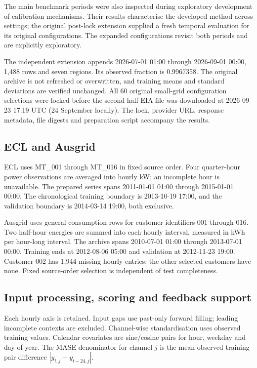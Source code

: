 \documentclass[11pt,a4paper]{article}
\begin{document}
The main benchmark periods were also inspected during exploratory development of calibration mechanisms. Their results characterise the developed method across settings; the original post-lock extension supplied a fresh temporal evaluation for its original configurations. The expanded configurations revisit both periods and are explicitly exploratory.

The independent extension appends 2026-07-01 01:00 through 2026-09-01 00:00, 1,488 rows and seven regions. Its observed fraction is 0.9967358. The original archive is not refreshed or overwritten, and training means and standard deviations are verified unchanged. All 60 original small-grid configuration selections were locked before the second-half EIA file was downloaded at 2026-09-23 17:19 UTC (24 September locally). The lock, provider URL, response metadata, file digests and preparation script accompany the results.

\subsection{ECL and Ausgrid}
ECL uses MT\_001 through MT\_016 in fixed source order. Four quarter-hour power observations are averaged into hourly kW; an incomplete hour is unavailable. The prepared series spans 2011-01-01 01:00 through 2015-01-01 00:00. The chronological training boundary is 2013-10-19 17:00, and the validation boundary is 2014-03-14 19:00, both exclusive.

Ausgrid uses general-consumption rows for customer identifiers 001 through 016. Two half-hour energies are summed into each hourly interval, measured in kWh per hour-long interval. The archive spans 2010-07-01 01:00 through 2013-07-01 00:00. Training ends at 2012-08-06 05:00 and validation at 2012-11-23 19:00. Customer 002 has 1,944 missing hourly entries; the other selected customers have none. Fixed source-order selection is independent of test completeness.

\subsection{Input processing, scoring and feedback support}
Each hourly axis is retained. Input gaps use past-only forward filling; leading incomplete contexts are excluded. Channel-wise standardisation uses observed training values. Calendar covariates are sine/cosine pairs for hour, weekday and day of year. The MASE denominator for channel $j$ is the mean observed training-pair difference $|y_{t,j}-y_{t-24,j}|$.
\end{document}
